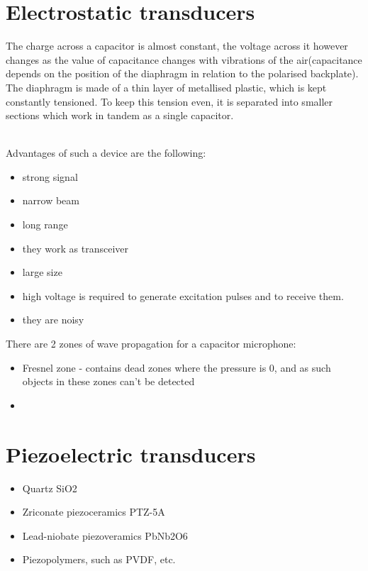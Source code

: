 \section{Electrostatic transducers}

The charge across a capacitor is almost constant, the voltage across it however changes as the value of capacitance changes with vibrations of the air(capacitance depends on the position of the diaphragm in relation to the polarised backplate).
\\
The diaphragm is made of  a thin layer of metallised plastic, which is kept constantly tensioned. To keep this tension even, it is separated into smaller sections which work in tandem as a single capacitor.

\\
Advantages of such a device are the following:
\begin{itemize}
    \item strong signal
    \item narrow beam
    \item long range
    \item they work as transceiver
\end{itemize}

\begin{itemize}
    \item large size
    \item high voltage is required to generate excitation pulses and to receive them.
    \item they are noisy
\end{itemize}


{
    There are 2 zones of wave propagation for a capacitor microphone:
    \begin{itemize}
        \item Fresnel zone - contains dead zones where the pressure is 0, and as such objects in these zones can't be detected
        \item 
    \end{itemize}
}



\section{Piezoelectric transducers}
{
    \begin{itemize}
            \item Quartz SiO2
            \item Zriconate piezoceramics PTZ-5A
            \item Lead-niobate piezoveramics PbNb2O6
            \item Piezopolymers, such as PVDF, etc.
    \end{itemize}
}

